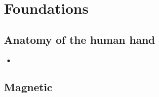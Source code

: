 
\lhead[\chaptername~\thechapter]{\rightmark}

\rhead[\leftmark]{}

\lfoot[\thepage]{}

\cfoot{}

\rfoot[]{\thepage}


\chapter{Foundations}
\label{cha:foundations}

\section{Anatomy of the human hand}
\label{sec:anatomy}
\begin{itemize}
\item \cite{john2006advanced}
\end{itemize}

\section{Magnetic}
\label{sec:magneticFound}
